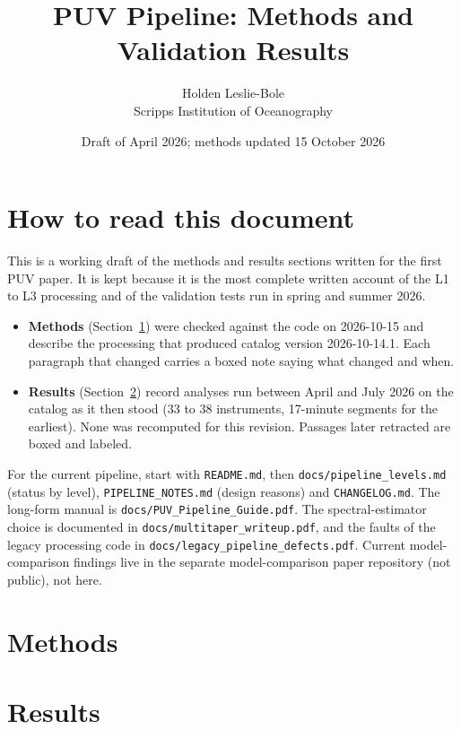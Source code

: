 \documentclass[11pt]{article}
\title{PUV Pipeline: Methods and Validation Results}
\author{Holden Leslie-Bole \\ Scripps Institution of Oceanography}
\date{Draft of April 2026; methods updated 15 October 2026}
\begin{document}
\maketitle

\section*{How to read this document}

This is a working draft of the methods and results sections written for the
first PUV paper. It is kept because it is the most complete written account of
the L1 to L3 processing and of the validation tests run in spring and summer
2026.

\begin{itemize}
  \item \textbf{Methods} (Section~\ref{sec:methods}) were checked against the code
    on 2026-10-15 and describe the processing that produced catalog version
    2026-10-14.1. Each paragraph that changed carries a boxed note saying what
    changed and when.
  \item \textbf{Results} (Section~\ref{sec:results}) record analyses run between
    April and July 2026 on the catalog as it then stood (33 to 38 instruments,
    17-minute segments for the earliest). None was recomputed for this revision.
    Passages later retracted are boxed and labeled.
\end{itemize}

For the current pipeline, start with \texttt{README.md}, then
\texttt{docs/pipeline\_levels.md} (status by level),
\texttt{PIPELINE\_NOTES.md} (design reasons) and \texttt{CHANGELOG.md}. The
long-form manual is \texttt{docs/PUV\_Pipeline\_Guide.pdf}. The spectral-estimator
choice is documented in \texttt{docs/multitaper\_writeup.pdf}, and the faults of
the legacy processing code in \texttt{docs/legacy\_pipeline\_defects.pdf}. Current
model-comparison findings live in the separate model-comparison paper repository (not public), not here.

\tableofcontents
\newpage

\section{Methods}
\label{sec:methods}


\newpage
\section{Results}
\label{sec:results}

\end{document}
